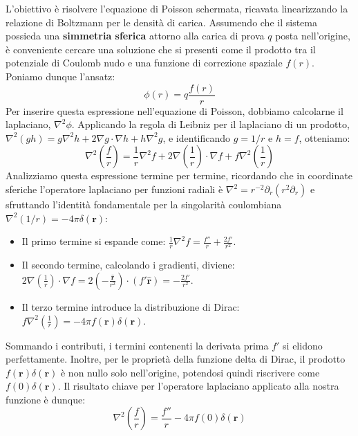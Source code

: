 L'obiettivo è risolvere l'equazione di Poisson schermata, ricavata linearizzando la relazione di Boltzmann per le densità di carica. Assumendo che il sistema possieda una \textbf{simmetria sferica} attorno alla carica di prova $q$ posta nell'origine, è conveniente cercare una soluzione che si presenti come il prodotto tra il potenziale di Coulomb nudo e una funzione di correzione spaziale $f(r)$. Poniamo dunque l'ansatz:
\begin{equation}
\phi(r) = q \frac{f(r)}{r}
\end{equation}
Per inserire questa espressione nell'equazione di Poisson, dobbiamo calcolarne il laplaciano, $\nabla^2\phi$. Applicando la regola di Leibniz per il laplaciano di un prodotto, $\nabla^2(gh) = g\nabla^2h + 2\nabla g \cdot \nabla h + h\nabla^2g$, e identificando $g = 1/r$ e $h = f$, otteniamo:
\begin{equation}
\nabla^2\left(\frac{f}{r}\right) = \frac{1}{r}\nabla^2f + 2\nabla\left(\frac{1}{r}\right) \cdot \nabla f + f \nabla^2\left(\frac{1}{r}\right)
\end{equation}
Analizziamo questa espressione termine per termine, ricordando che in coordinate sferiche l'operatore laplaciano per funzioni radiali è $\nabla^2 = r^{-2}\partial_r(r^2\partial_r)$ e sfruttando l'identità fondamentale per la singolarità coulombiana $\nabla^2(1/r) = -4\pi\delta(\mathbf{r})$:
\begin{itemize}
\item Il primo termine si espande come: $\frac{1}{r}\nabla^2f = \frac{f''}{r} + \frac{2f'}{r^2}$.
\item Il secondo termine, calcolando i gradienti, diviene: $2\nabla\left(\frac{1}{r}\right) \cdot \nabla f = 2\left(-\frac{\hat{\mathbf{r}}}{r^2}\right) \cdot (f'\hat{\mathbf{r}}) = -\frac{2f'}{r^2}$.
\item Il terzo termine introduce la distribuzione di Dirac: $f \nabla^2\left(\frac{1}{r}\right) = -4\pi f(\mathbf{r}) \delta(\mathbf{r})$.
\end{itemize}
Sommando i contributi, i termini contenenti la derivata prima $f'$ si elidono perfettamente. Inoltre, per le proprietà della funzione delta di Dirac, il prodotto $f(\mathbf{r})\delta(\mathbf{r})$ è non nullo solo nell'origine, potendosi quindi riscrivere come $f(0)\delta(\mathbf{r})$. Il risultato chiave per l'operatore laplaciano applicato alla nostra funzione è dunque:
\begin{equation}
\nabla^2\left(\frac{f}{r}\right) = \frac{f''}{r} - 4\pi f(0) \delta(\mathbf{r})
\end{equation}


